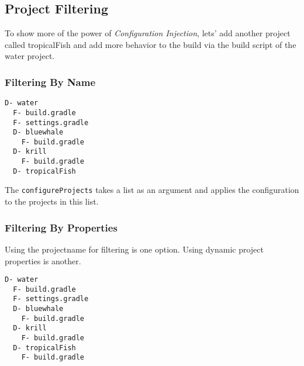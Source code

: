 \subsection{Project Filtering} %
\label{sub:project_filtering}
To show more of the power of \emph{Configuration Injection}, lets' add another project called tropicalFish and add more behavior to the build via the build script of the water project.

\subsubsection{Filtering By Name} %
\label{ssub:filtering_by_name}
\begin{minipage}[t]{7cm}
\begin{Verbatim}[frame=single,label=Project Tree]
D- water
  F- build.gradle
  F- settings.gradle
  D- bluewhale
    F- build.gradle
  D- krill
    F- build.gradle
  D- tropicalFish	
\end{Verbatim}
\end{minipage}	
\begin{minipage}[t]{9cm}
\end{minipage}

The \texttt{configureProjects} takes a list as an argument and applies the configuration to the projects in this list.

\subsubsection{Filtering By Properties} %
\label{ssub:filtering_by_properties}

Using the projectname for filtering is one option. Using dynamic project properties is another.
\\

\begin{minipage}[t]{7cm}
\begin{Verbatim}[frame=single,label=Project Tree]
D- water
  F- build.gradle
  F- settings.gradle
  D- bluewhale
    F- build.gradle
  D- krill
    F- build.gradle
  D- tropicalFish
    F- build.gradle
\end{Verbatim}
\end{minipage}	
\begin{minipage}[t]{9cm}
\end{minipage}

